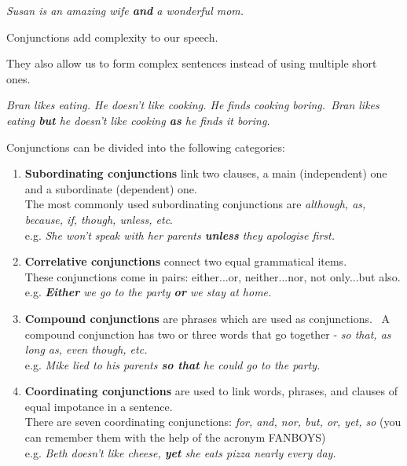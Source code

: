 \documentclass[hidelinks,10pt,a4paper]{article}
\begin{document}
\begin{center}
	\textit{Susan is an amazing wife \textbf{and} a wonderful mom.}
\end{center}

Conjunctions add complexity to our speech.

They also allow us to form complex sentences instead of using multiple short ones.

\begin{center}
	\textit{Bran likes eating. He doesn't like cooking. He finds cooking boring.\
	Bran likes eating \textbf{but} he doesn't like cooking \textbf{as} he finds it boring.}
\end{center}

Conjunctions can be divided into the following categories:
\begin{enumerate}[label=(\alph*)]
	\item \textbf{Subordinating conjunctions} link two clauses, a main (independent) one and a subordinate (dependent) one.\\
		The most commonly used subordinating conjunctions are \textit{although, as, because, if, though, unless, etc}.\\
		e.g. \textit{She won't speak with her parents \textbf{unless} they apologise first.}
	\item \textbf{Correlative conjunctions} connect two equal grammatical items.\\
		These conjunctions come in pairs: either...or, neither...nor, not only...but also. \\
		e.g. \textit{\textbf{Either} we go to the party \textbf{or} we stay at home.}
	\item \textbf{Compound conjunctions} are phrases which are used as conjunctions. \
		A compound conjunction has two or three words that go together - \textit{so that, as long as, even though, etc.}\\
		e.g. \textit{Mike lied to his parents \textbf{so that} he could go to the party.}
	\item \textbf{Coordinating conjunctions} are used to link words, phrases, and clauses of equal impotance in a sentence. \\
		There are seven coordinating conjunctions: \textit{for, and, nor, but, or, yet, so} (you can remember them with the help of the acronym FANBOYS)\\
		e.g. \textit{Beth doesn't like cheese, \textbf{yet} she eats pizza nearly every day.}
\end{enumerate}
\end{document}
